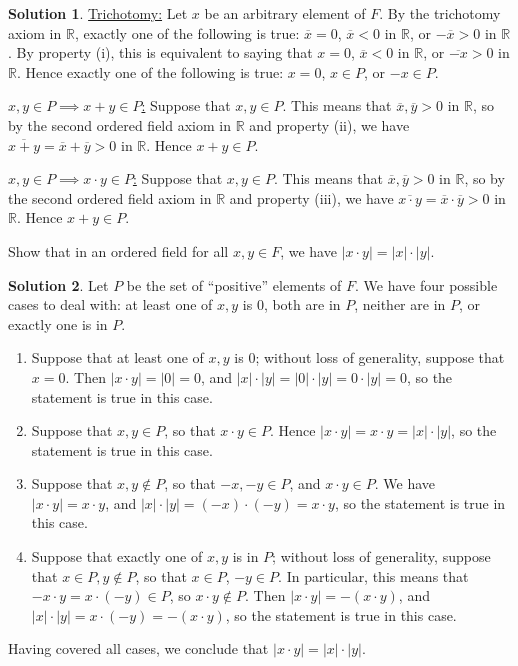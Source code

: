 \documentclass[12pt]{article}
\theoremstyle{definition}
\theoremstyle{definition}
\newtheorem*{soln}{Solution}
\newcommand{\R}{\mathbb{R}}
\begin{document}
\begin{soln}
\underline{Trichotomy:}
Let $x$ be an arbitrary element of $F$. By the trichotomy axiom in $\R$, exactly one of the following is true: $\overline{x}=0$, $\overline{x}<0$ in $\R$, or $-\overline{x}>0$ in $\R$. By property (i), this is equivalent to saying that $x=0$, $\overline{x}<0$ in $\R$, or $\overline{-x}>0$ in $\R$. Hence exactly one of the following is true: $x=0$, $x\in P$, or $-x\in P$.

\underline{$x,y\in P\implies x+y\in P$:}
Suppose that $x,y\in P$. This means that $\overline{x},\overline{y}>0$ in $\R$, so by the second ordered field axiom in $\R$ and property (ii), we have $\overline{x+y}=\overline{x}+\overline{y}>0$ in $\R$. Hence $x+y\in P$.

\underline{$x,y\in P\implies x\cdot y\in P$:}
Suppose that $x,y\in P$. This means that $\overline{x},\overline{y}>0$ in $\R$, so by the second ordered field axiom in $\R$ and property (iii), we have $\overline{x\cdot y}=\overline{x}\cdot\overline{y}>0$ in $\R$. Hence $x+y\in P$.
\end{soln}

\break

\begin{prob}
Show that in an ordered field for all $x,y\in F$, we have $|x\cdot y|=|x|\cdot|y|$.
\end{prob}

\begin{soln}
Let $P$ be the set of ``positive'' elements of $F$. We have four possible cases to deal with: at least one of $x,y$ is $0$, both are in $P$, neither are in $P$, or exactly one is in $P$.
\begin{enumerate}[label=\textbf{Case \arabic*.}]
\item Suppose that at least one of $x,y$ is $0$; without loss of generality, suppose that $x=0$. Then $|x\cdot y|=|0|=0$, and $|x|\cdot |y|=|0|\cdot |y|=0\cdot |y|=0$, so the statement is true in this case.

\item Suppose that $x,y\in P$, so that $x\cdot y\in P$. Hence $|x\cdot y|=x\cdot y=|x|\cdot |y|$, so the statement is true in this case.

\item Suppose that $x,y\notin P$, so that $-x,-y\in P$, and $x\cdot y\in P$. We have $|x\cdot y|=x\cdot y$, and $|x|\cdot |y|=(-x)\cdot (-y)=x\cdot y$, so the statement is true in this case.

\item Suppose that exactly one of $x,y$ is in $P$; without loss of generality, suppose that $x\in P,y\notin P$, so that $x\in P$, $-y\in P$. In particular, this means that $-x\cdot y=x\cdot (-y)\in P$, so $x\cdot y\notin P$. Then $|x\cdot y|=-(x\cdot y)$, and $|x|\cdot |y|=x\cdot (-y)=-(x\cdot y)$, so the statement is true in this case.
\end{enumerate}
Having covered all cases, we conclude that $|x\cdot y|=|x|\cdot|y|$.
\end{soln}
\end{document}
